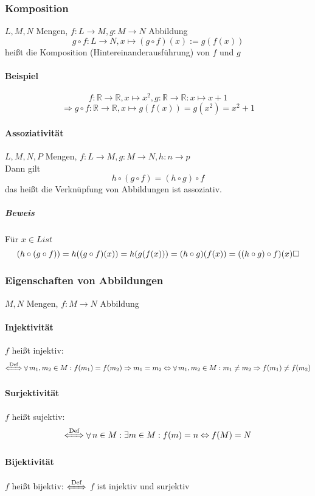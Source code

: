 \documentclass[a4paper]{scrartcl}
\DeclareMathOperator{\Forall}{\forall}
\theoremstyle{definition}
\theoremstyle{plain}
\theoremstyle{plain}
\theoremstyle{remark}
\theoremstyle{remark}
\theoremstyle{remark}
\begin{document}
\subsubsection{Komposition}
\label{sec-2-6-6}
$L,M,N$ Mengen, $f:L\to M,g:M\to N$ Abbildung \\
    \[g\circ f: L\to N, x\mapsto(g\circ f)(x):=g(f(x))\]
heißt die Komposition (Hintereinanderausführung) von $f$ und $g$
\paragraph{Beispiel}
\label{sec-2-6-6-1}
\[f:\mathbb{R}\to\mathbb{R},x\mapsto x^2, g:\mathbb{R}\to\mathbb{R}:x\mapsto x + 1\]
\[\Rightarrow g\circ f:\mathbb{R}\to\mathbb{R},x\mapsto g(f(x)) = g(x^2) = x^2 + 1\]
\paragraph{Assoziativität}
\label{sec-2-6-6-2}
$L,M,N,P$ Mengen, $f:L\to M, g:M\to N,h:n\to p$ \\
     Dann gilt
\[h\circ (g\circ f) = (h\circ g)\circ f\]
das heißt die Verknüpfung von Abbildungen ist assoziativ.
\subparagraph{Beweis}
\label{sec-2-6-6-2-1}
Für $x\in L ist$ \\
      \[(h\circ (g\circ f)) = h((g\circ f)(x)) = h(g(f(x))) = (h\circ g)(f(x)) = ((h\circ g)\circ f)(x)\hfill\square\]
\subsubsection{Eigenschaften von Abbildungen}
\label{sec-2-6-7}
$M,N$ Mengen, $f:M\to N$ Abbildung
\paragraph{Injektivität}
\label{sec-2-6-7-1}
$f$ heißt injektiv: \[\xLeftrightarrow{\text{Def}} \Forall m_1,m_2\in M: f(m_1) = f(m_2) \Rightarrow m_1 = m_2 \Leftrightarrow \Forall m_1,m_2\in M: m_1\neq m_2 \Rightarrow f(m_1)\neq f(m_2)\]
\paragraph{Surjektivität}
\label{sec-2-6-7-2}
$f$ heißt sujektiv:
\[\xLeftrightarrow{\text{Def}} \Forall n\in M :\exists m\in M: f(m) = n \Leftrightarrow f(M) = N\]
\paragraph{Bijektivität}
\label{sec-2-6-7-3}
$f$ heißt bijektiv: $\xLeftrightarrow{\text{Def}}$ $f$ ist injektiv und surjektiv
\end{document}

